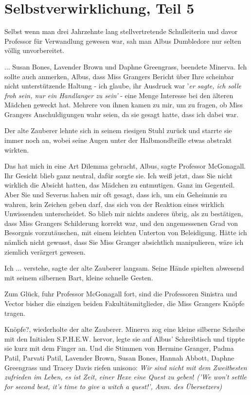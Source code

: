 \chapter{Selbstverwirklichung, Teil 5}

Selbst wenn man drei Jahrzehnte lang stellvertretende Schulleiterin und davor
Professor für Verwandlung gewesen war, sah man Albus Dumbledore nur selten
völlig unvorbereitet.

\glqq{}... Susan Bones, Lavender Brown und Daphne Greengrass\grqq{}, beendete
Minerva. \glqq{}Ich sollte auch anmerken, Albus, dass Miss Grangers Bericht über
Ihre scheinbar nicht unterstützende Haltung - ich glaube, ihr Ausdruck war
'\emph{er sagte, ich solle froh sein, nur ein Handlanger zu sein'} - eine Menge
Interesse bei den älteren Mädchen geweckt hat. Mehrere von ihnen kamen zu mir,
um zu fragen, ob Miss Grangers Anschuldigungen wahr seien, da sie gesagt hatte,
dass ich dabei war.\grqq{}

Der alte Zauberer lehnte sich in seinem riesigen Stuhl zurück und starrte sie
immer noch an, wobei seine Augen unter der Halbmondbrille etwas abstrakt
wirkten.

\glqq{}Das hat mich in eine Art Dilemma gebracht, Albus\grqq{}, sagte Professor
McGonagall. Ihr Gesicht blieb ganz neutral, dafür sorgte sie. \glqq{}Ich weiß
jetzt, dass Sie nicht wirklich die Absicht hatten, das Mädchen zu entmutigen.
Ganz im Gegenteil. Aber Sie und Severus haben mir oft gesagt, dass ich, um ein
Geheimnis zu wahren, kein Zeichen geben darf, das sich von der Reaktion eines
wirklich Unwissenden unterscheidet. So blieb mir nichts anderes übrig, als zu
bestätigen, dass Miss Grangers Schilderung korrekt war, und den angemessenen
Grad von Besorgnis vorzutäuschen, mit einem leichten Unterton von Beleidigung.
Hätte ich nämlich nicht gewusst, dass Sie Miss Granger absichtlich manipulieren,
wäre ich ziemlich verärgert gewesen.\grqq{}

\glqq{}Ich ... verstehe\grqq{}, sagte der alte Zauberer langsam. Seine Hände
spielten abwesend mit seinem silbernen Bart, kleine schnelle Gesten.

\glqq{}Zum Glück\grqq{}, fuhr Professor McGonagall fort, \glqq{}sind die
Professoren Sinistra und Vector bisher die einzigen beiden Fakultätsmitglieder,
die Miss Grangers Knöpfe tragen.\grqq{}

\glqq{}Knöpfe?\grqq{}, wiederholte der alte Zauberer. Minerva zog eine kleine
silberne Scheibe mit den Initialen S.P.H.E.W. hervor, legte sie auf Albus'
Schreibtisch und tippte sie kurz mit dem Finger an. Und die Stimmen von Hermine
Granger, Padma Patil, Parvati Patil, Lavender Brown, Susan Bones, Hannah Abbott,
Daphne Greengrass und Tracey Davis riefen unisono: \glqq{}\emph{Wir sind nicht
mit dem Zweitbesten zufrieden im Leben, es ist Zeit, einer Hexe eine Quest zu
geben}!\grqq{} \emph{('We won't settle for second best, it's time to give a witch a
quest!', Anm. des Übersetzers)}

